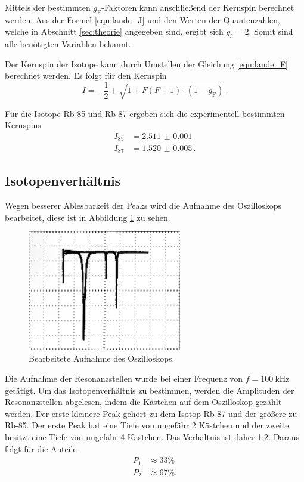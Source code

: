 Mittels der bestimmten $g_{\text{F}}$-Faktoren kann anschließend der Kernspin berechnet werden.
Aus der Formel \ref{eqn:lande_J} und den Werten der Quantenzahlen, welche in Abschnitt \ref{sec:theorie} angegeben sind,
ergibt sich $g_{\text{J}} = 2$.
Somit sind alle benötigten Variablen bekannt.

Der Kernspin der Isotope kann durch Umstellen der Gleichung \ref{eqn:lande_F} berechnet werden.
Es folgt für den Kernspin
\begin{equation}
    I = -\frac{1}{2} + \sqrt{1 + F(F+1) \cdot (1 - g_{\text{F}})} \, .
\end{equation}

Für die Isotope Rb-85 und Rb-87 ergeben sich die experimentell bestimmten Kernspins
\begin{align}
    I_{85} &= \num{2.511(1)} \\
    I_{87} &= \num{1.520(5)} \, .
\end{align}

\subsection{Isotopenverhältnis}
\label{sec:Isotopenverhältnis}

Wegen besserer Ablesbarkeit der Peaks wird die Aufnahme des Oszilloskops bearbeitet, diese ist in Abbildung \ref{fig:edit} zu sehen.

\begin{figure}
    \centering
    \includegraphics[width=0.6\textwidth]{content/messung/edit.jpg}
    \caption{Bearbeitete Aufnahme des Oszilloskops.}
    \label{fig:edit}
\end{figure}

Die Aufnahme der Resonanzstellen wurde bei einer Frequenz von $f = \qty{100}{\kilo\hertz}$ getätigt.
Um das Isotopenverhältnis zu bestimmen, werden die Amplituden der Resonanzstellen abgelesen, indem
die Kästchen auf dem Oszilloskop gezählt werden.
Der erste kleinere Peak gehört zu dem Isotop Rb-87 und der größere zu Rb-85.
Der erste Peak hat eine Tiefe von ungefähr 2 Kästchen und der zweite besitzt eine Tiefe von ungefähr 4 Kästchen.
Das Verhältnis ist daher 1:2.
Daraus folgt für die Anteile
\begin{align}
    P_1 &\approx 33 \% \\
    P_2 &\approx 67 \% .
\end{align}

